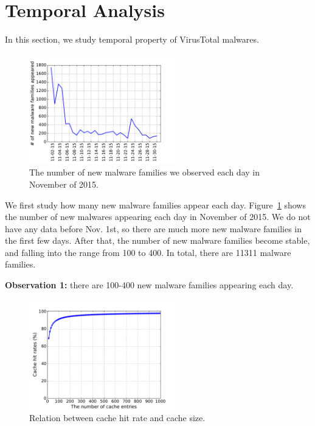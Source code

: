 
\section{Temporal Analysis}
\label{sec:temporal}

In this section, we study temporal property of VirusTotal malwares. 

\begin{figure}[t!]
\begin{center}
\includegraphics[width=2.5in]{figure/new_family}
\caption{The number of new malware families we observed each day in November of 2015.}
\label{fig:new}
\end{center}
\end{figure}


We first study how many new malware families appear each day. 
Figure~\ref{fig:new} shows the number of new malwares appearing each day in November of 2015. 
We do not have any data before Nov. 1st, 
so there are much more new malware families in the first few days.
After that, the number of new malware families become stable, and falling into the range from 100 to 400. 
In total, there are 11311 malware families. 

{\bf Observation 1:} 
there are 100-400 new malware families appearing each day. 


\begin{figure}[t!]
\begin{center}
\includegraphics[width=2.5in]{figure/LRU}
\caption{Relation between cache hit rate and cache size.}
\label{fig:cache}
\end{center}
\end{figure}


